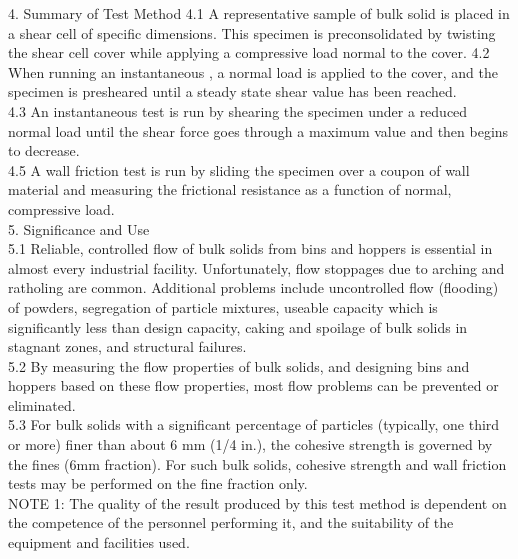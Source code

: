 4. Summary of Test Method
4.1 A representative sample of bulk solid is placed in a shear cell of specific dimensions. This specimen is preconsolidated by twisting the shear cell cover while applying a compressive load normal to the cover.
4.2 When running an instantaneous
, a normal load is applied to the cover, and the specimen is presheared until a steady state shear value has been reached. \\
4.3 An instantaneous test is run by shearing the specimen under a reduced normal load until the shear force goes through a maximum value and then begins to decrease. \\
4.5 A wall friction test is run by sliding the specimen over a coupon of wall material and measuring the frictional resistance as a function of normal, compressive load. \\

5. Significance and Use \\
5.1 Reliable, controlled flow of bulk solids from bins and hoppers is essential in almost every industrial facility. Unfortunately, flow stoppages due to arching and ratholing are common. Additional problems include uncontrolled flow (flooding) of powders, segregation of particle mixtures, useable capacity which is significantly less than design capacity, caking and spoilage of bulk solids in stagnant zones, and structural failures. \\
5.2 By measuring the flow properties of bulk solids, and designing bins and hoppers based on these flow properties, most flow problems can be prevented or eliminated. \\
5.3 For bulk solids with a significant percentage of particles (typically, one third or more) finer than about 6 mm (1/4 in.), the cohesive strength is governed by the fines (6mm fraction). For such bulk solids, cohesive strength and wall friction tests may be performed on the fine fraction only. \\
NOTE 1: The quality of the result produced by this test method is dependent on the competence of the personnel performing it, and the suitability of the equipment and facilities used. \\



